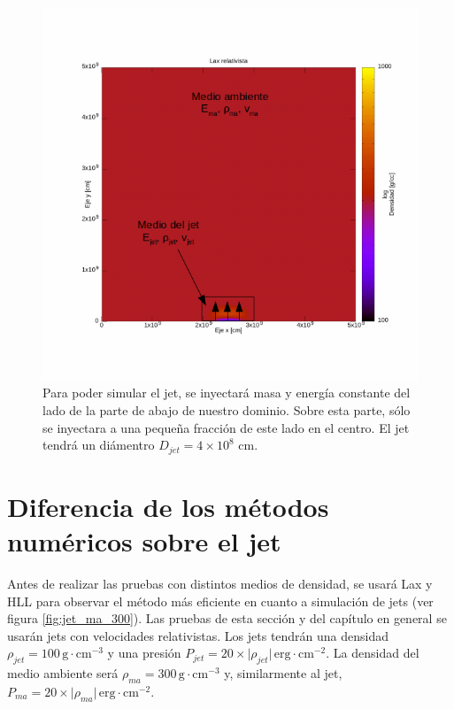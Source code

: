 \documentclass[12pt,a4paper]{book}
\begin{document}
\begin{figure}
\centering
\includegraphics[scale=0.5]{./Figuras/Pruebas/Prueba_jet/jet_ejemplo}
\caption{\label{fig:condicion_inicial_jet}Para poder simular el jet, se inyectará masa y energía constante del lado de la parte de abajo de nuestro dominio. Sobre esta parte, sólo se inyectara a una pequeña fracción de este lado en el centro. El jet tendrá un diámentro $D_{jet} = 4 \times 10^{8}$ cm. }
\end{figure}

\section{Diferencia de los métodos numéricos sobre el jet}

Antes de realizar las pruebas con distintos medios de densidad, se usará Lax y HLL para observar el método más eficiente en cuanto a simulación de jets (ver figura \ref{fig:jet_ma_300}). Las pruebas de esta sección y del capítulo en general se usarán jets con velocidades relativistas. Los jets  tendrán una densidad $\rho_{jet} = 100 \, \mathrm{g} \cdot \mathrm{cm}^{-3}$ y una presión $P_{jet} = 20 \times \lvert \rho_{jet} \rvert \, \mathrm{erg} \cdot \mathrm{cm}^{-2}$. La densidad del medio ambiente será $\rho_{ma} = 300 \, \mathrm{g} \cdot \mathrm{cm}^{-3}$ y, similarmente al jet, $P_{ma} = 20 \times \lvert \rho_{ma} \rvert \, \mathrm{erg} \cdot \mathrm{cm}^{-2}$.
\end{document}
